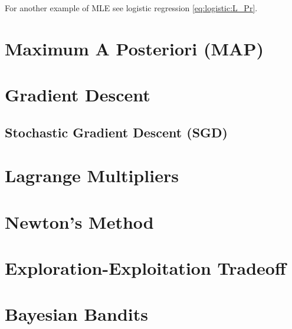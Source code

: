 For another example of MLE see logistic regression \cref{eq:logistic:L_Pr}.

\section{Maximum A Posteriori (MAP)}
\label{opt:MAP}

\section{Gradient Descent}
\label{opt:grad_descent}

\subsection{Stochastic Gradient Descent (SGD)}
\label{opt:grad_descent:stochastic}

\section{Lagrange Multipliers}
\label{opt:lagrange_mult}

\section{Newton's Method}
\label{opt:newton}

\section{Exploration-Exploitation Tradeoff}
\label{opt:EE_tradeoff}

\section{Bayesian Bandits}
\label{opt:BB}

